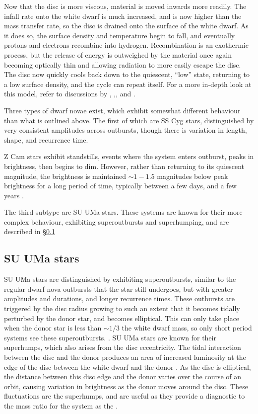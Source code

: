 Now that the disc is more viscous, material is moved inwards more readily. The infall rate onto the white dwarf is much increased, and is now higher than the mass transfer rate, so the disc is drained onto the surface of the white dwarf. As it does so, the surface density and temperature begin to fall, and eventually protons and electrons recombine into hydrogen. Recombination is an exothermic process, but the release of energy is outweighed by the material once again becoming optically thin and allowing radiation to more easily escape the disc. The disc now quickly cools back down to the quiescent, ``low'' state, returning to a low surface density, and the cycle can repeat itself. For a more in-depth look at this model, refer to discussions by \citet{cannizzo1993}, \citet{osaki1996},, and \citet{Hameury2002}.

Three types of dwarf novae exist, which exhibit somewhat different behaviour than what is outlined above. The first of which are SS Cyg stars, distinguished by very consistent amplitudes across outbursts, though there is variation in length, shape, and recurrence time.

Z Cam stars exhibit standstills, events where the system enters outburst, peaks in brightness, then begins to dim. However, rather than returning to its quiescent magnitude, the brightness is maintained $\sim 1-1.5$ magnitudes below peak brightness for a long period of time, typically between a few days, and a few years \citep{simonsen2014}.

The third subtype are SU UMa stars. These systems are known for their more complex behaviour, exhibiting superoutbursts and superhumping, and are described in \S\ref{sect:introduction:SU UMa}

\subsection{SU UMa stars}
\label{sect:introduction:SU UMa}

SU UMa stars are distinguished by exhibiting superoutbursts, similar to the regular dwarf nova outbursts that the star still undergoes, but with greater amplitudes and durations, and longer recurrence times. These outbursts are triggered by the disc radius growing to such an extent that it becomes tidally perturbed by the donor star, and becomes elliptical. This can only take place when the donor star is less than $\sim 1/3$ the white dwarf mass, so only short period systems see these superoutbursts. \citep{hellier2001}.
SU UMa stars are known for their superhumps, which also arises from the disc eccentricity. The tidal interaction between the disc and the donor produces an area of increased luminosity at the edge of the disc between the white dwarf and the donor \citep{warner1988}. As the disc is elliptical, the distance between this disc edge and the donor varies over the course of an orbit, causing variation in brightness as the donor moves around the disc.
These fluctuations are the superhumps, and are useful as they provide a diagnostic to the mass ratio for the system as the  \citep{Patterson1998, Patterson2001, patterson2005}.

